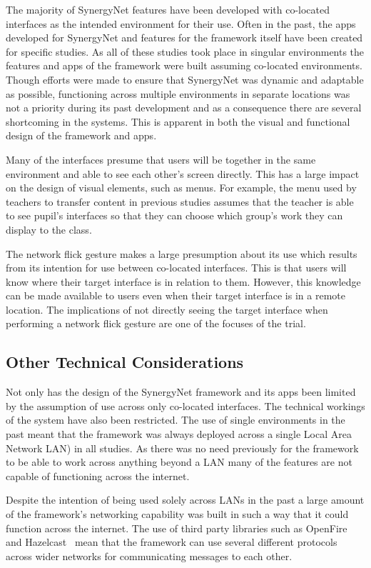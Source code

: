 \documentclass[a4paper,11pt]{article}
\begin{document}
The majority of SynergyNet features have been developed with co-located interfaces as the intended environment for their use.
Often in the past, the apps developed for SynergyNet and features for the framework itself have been created for specific studies.
As all of these studies took place in singular environments the features and apps of the framework were built assuming co-located environments.
Though efforts were made to ensure that SynergyNet was dynamic and adaptable as possible, functioning across multiple environments in separate locations was not a priority during its past development and as a consequence there are several shortcoming in the systems.
This is apparent in both the visual and functional design of the framework and apps.

Many of the interfaces presume that users will be together in the same environment and able to see each other's screen directly.
This has a large impact on the design of visual elements, such as menus.
For example, the menu used by teachers to transfer content in previous studies assumes that the teacher is able to see pupil's interfaces so that they can choose which group's work they can display to the class.

The network flick gesture makes a large presumption about its use which results from its intention for use between co-located interfaces.
This is that users will know where their target interface is in relation to them.
However, this knowledge can be made available to users even when their target interface is in a remote location.
The implications of not directly seeing the target interface when performing a network flick gesture are one of the focuses of the trial.

\subsection{Other Technical Considerations}

Not only has the design of the SynergyNet framework and its apps been limited by the assumption of use across only co-located interfaces.
The technical workings of the system have also been restricted.
The use of single environments in the past meant that the framework was always deployed across a single Local Area Network LAN) in all studies.
As there was no need previously for the framework to be able to work across anything beyond a LAN many of the features are not capable of functioning across the internet.

Despite the intention of being used solely across LANs in the past a large amount of the framework's networking capability was built in such a way that it could function across the internet.
The use of third party libraries such as OpenFire~\cite{igniterealtime:2016} and Hazelcast~\cite{hazelcast:2016} mean that the framework can use several different protocols across wider networks for communicating messages to each other.
\end{document}
